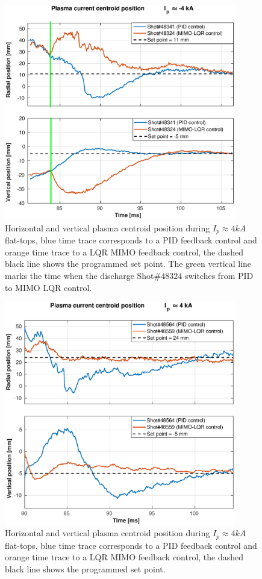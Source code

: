 \begin{figure}[h]
	\centering
	\includegraphics[width=0.9\textwidth]{Chp5/PIDvsMIMO_341_324_2.eps}
	\caption{ Horizontal and vertical plasma centroid position during  $I_p\approx 4kA$  flat-tops, blue time trace corresponds to a PID feedback control and orange time trace to a LQR MIMO feedback control, the dashed black line shows the programmed set point. The green vertical line marks the time  when the  discharge Shot$\# 48324$ switches  from PID to MIMO LQR control.	\label{341_342}}
\end{figure}


\begin{figure}[h]
	\centering
	\includegraphics[width=0.9\textwidth]{Chp5/PIDvsMIMO_564_559_2.eps}
	\caption{ Horizontal and vertical plasma centroid position during  $I_p\approx 4kA$  flat-tops, blue time trace corresponds to a PID feedback control and orange time trace to a LQR MIMO feedback control, the dashed black line shows the programmed set point. \label{564_559}}
\end{figure}





